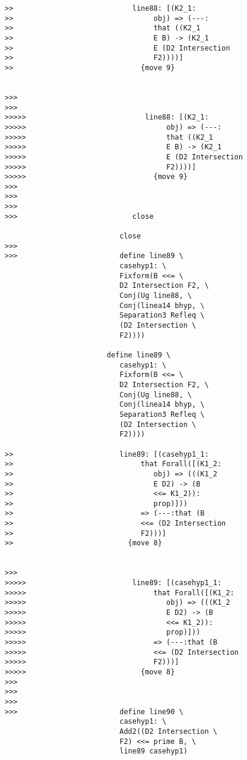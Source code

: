 \documentclass[12pt]{article}
\begin{document}
\begin{verbatim}
>>                            line88: [(K2_1:
>>                                 obj) => (---:
>>                                 that ((K2_1
>>                                 E B) -> (K2_1
>>                                 E (D2 Intersection
>>                                 F2))))]
>>                              {move 9}


>>>
>>>
>>>>>                            line88: [(K2_1:
>>>>>                                 obj) => (---:
>>>>>                                 that ((K2_1
>>>>>                                 E B) -> (K2_1
>>>>>                                 E (D2 Intersection
>>>>>                                 F2))))]
>>>>>                              {move 9}
>>>
>>>
>>>
>>>                           close

                           close
>>>
>>>                        define line89 \
                           casehyp1: \
                           Fixform(B <<= \
                           D2 Intersection F2, \
                           Conj(Ug line88, \
                           Conj(linea14 bhyp, \
                           Separation3 Refleq \
                           (D2 Intersection \
                           F2))))

                        define line89 \
                           casehyp1: \
                           Fixform(B <<= \
                           D2 Intersection F2, \
                           Conj(Ug line88, \
                           Conj(linea14 bhyp, \
                           Separation3 Refleq \
                           (D2 Intersection \
                           F2))))

>>                         line89: [(casehyp1_1:
>>                              that Forall([(K1_2:
>>                                 obj) => (((K1_2
>>                                 E D2) -> (B
>>                                 <<= K1_2)):
>>                                 prop)]))
>>                              => (---:that (B
>>                              <<= (D2 Intersection
>>                              F2)))]
>>                           {move 8}


>>>
>>>>>                         line89: [(casehyp1_1:
>>>>>                              that Forall([(K1_2:
>>>>>                                 obj) => (((K1_2
>>>>>                                 E D2) -> (B
>>>>>                                 <<= K1_2)):
>>>>>                                 prop)]))
>>>>>                              => (---:that (B
>>>>>                              <<= (D2 Intersection
>>>>>                              F2)))]
>>>>>                           {move 8}
>>>
>>>
>>>
>>>                        define line90 \
                           casehyp1: \
                           Add2((D2 Intersection \
                           F2) <<= prime B, \
                           line89 casehyp1)


\end{verbatim}
\end{document}
